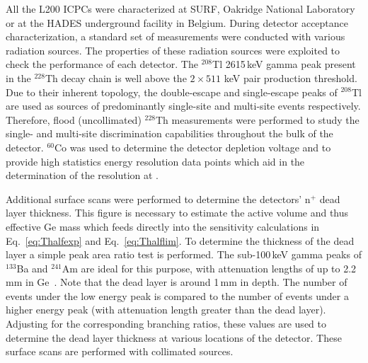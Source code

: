 All the L200 ICPCs were characterized at SURF, Oakridge National Laboratory or at the HADES underground facility in Belgium.  During detector acceptance characterization, a standard set of measurements were conducted with various radiation sources. The properties of these radiation sources were exploited to check the performance of each detector. The $^{208}$Tl 2615\,keV gamma peak present in the $^{228}$Th decay chain is well above the $2 \times 511$ keV pair production threshold. Due to their inherent topology, the double-escape and single-escape peaks of $^{208}$Tl are used as sources of predominantly single-site and multi-site events respectively. Therefore, flood (uncollimated) $^{228}$Th measurements were performed to study the single- and multi-site discrimination capabilities throughout the bulk of the detector. $^{60}$Co was used to determine the detector depletion voltage and to provide high statistics energy resolution data points which aid in the determination of the resolution at \Qbb{}.

Additional surface scans were performed to determine the detectors' n$^+$ dead layer thickness. This figure is necessary to estimate the active volume and thus effective Ge mass which feeds directly into the sensitivity calculations in Eq.~\ref{eq:Thalfexp} and Eq.~\ref{eq:Thalflim}. To determine the thickness of the dead layer a simple peak area ratio test is performed. The sub-100\,keV gamma peaks of $^{133}$Ba and $^{241}$Am are ideal for this purpose, with attenuation lengths of up to 2.2\,mm in Ge~\cite{NIST}. Note that the dead layer is around 1\,mm in depth. The number of events under the low energy peak is compared to the number of events under a higher energy peak (with attenuation length greater than the dead layer). Adjusting for the corresponding branching ratios, these values are used to determine the dead layer thickness at various locations of the detector. These surface scans are performed with collimated sources.  

